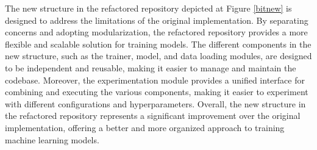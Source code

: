 The new structure in the refactored repository depicted at Figure \ref{bitnew} is designed to address the limitations of the original implementation. By separating concerns and adopting modularization, the refactored repository provides a more flexible and scalable solution for training models. The different components in the new structure, such as the trainer, model, and data loading modules, are designed to be independent and reusable, making it easier to manage and maintain the codebase. Moreover, the experimentation module provides a unified interface for combining and executing the various components, making it easier to experiment with different configurations and hyperparameters. Overall, the new structure in the refactored repository represents a significant improvement over the original implementation, offering a better and more organized approach to training machine learning models.

